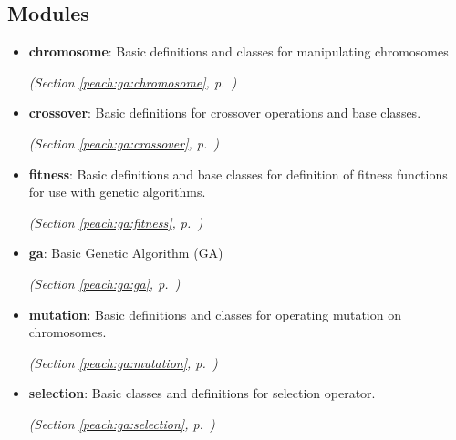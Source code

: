 
\subsection{Modules}

\begin{itemize}
\setlength{\parskip}{0ex}
\item \textbf{chromosome}: 
Basic definitions and classes for manipulating chromosomes


  \textit{(Section \ref{peach:ga:chromosome}, p.~\pageref{peach:ga:chromosome})}

\item \textbf{crossover}: 
Basic definitions for crossover operations and base classes.


  \textit{(Section \ref{peach:ga:crossover}, p.~\pageref{peach:ga:crossover})}

\item \textbf{fitness}: 
Basic definitions and base classes for definition of fitness functions for use
with genetic algorithms.


  \textit{(Section \ref{peach:ga:fitness}, p.~\pageref{peach:ga:fitness})}

\item \textbf{ga}: 
Basic Genetic Algorithm (GA)


  \textit{(Section \ref{peach:ga:ga}, p.~\pageref{peach:ga:ga})}

\item \textbf{mutation}: 
Basic definitions and classes for operating mutation on chromosomes.


  \textit{(Section \ref{peach:ga:mutation}, p.~\pageref{peach:ga:mutation})}

\item \textbf{selection}: 
Basic classes and definitions for selection operator.


  \textit{(Section \ref{peach:ga:selection}, p.~\pageref{peach:ga:selection})}

\end{itemize}



